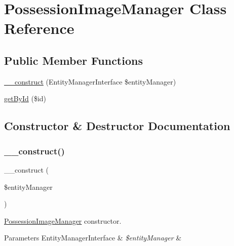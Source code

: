 \hypertarget{class_app_1_1_b_l_1_1_possession_image_manager}{}\section{Possession\+Image\+Manager Class Reference}
\label{class_app_1_1_b_l_1_1_possession_image_manager}
\subsection*{Public Member Functions}
\begin{DoxyCompactItemize}
\item 
\mbox{\hyperlink{class_app_1_1_b_l_1_1_possession_image_manager_abb5fb9a65dd8a81e7482dddbf71c5177}{\+\_\+\+\_\+construct}} (Entity\+Manager\+Interface \$entity\+Manager)
\item 
\mbox{\hyperlink{class_app_1_1_b_l_1_1_possession_image_manager_a04a2ab5bf1980cc1c81cd541b6bb1ee7}{get\+By\+Id}} (\$id)
\end{DoxyCompactItemize}


\subsection{Constructor \& Destructor Documentation}
\mbox{\label{class_app_1_1_b_l_1_1_possession_image_manager_abb5fb9a65dd8a81e7482dddbf71c5177}} 
\subsubsection{\texorpdfstring{\_\_construct()}{\_\_construct()}}
{\footnotesize\ttfamily \+\_\+\+\_\+construct (\begin{DoxyParamCaption}\item[{Entity\+Manager\+Interface}]{\$entity\+Manager }\end{DoxyParamCaption})}

\mbox{\hyperlink{class_app_1_1_b_l_1_1_possession_image_manager}{Possession\+Image\+Manager}} constructor. 
\begin{DoxyParams}[1]{Parameters}
Entity\+Manager\+Interface & {\em \$entity\+Manager} & \\
\hline
\end{DoxyParams}


